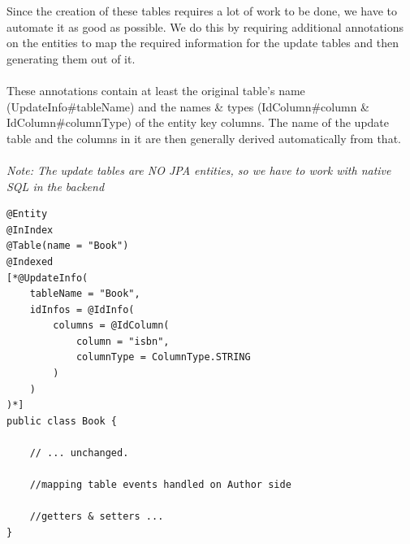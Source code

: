 Since the creation of these tables requires a lot of work to be done, we have to automate it as good as possible. We do this by requiring additional annotations on the entities to map the required information for the update tables and then generating them out of it.
\\\\
These annotations contain at least the original table's name (UpdateInfo\#tableName) and the names \& types (IdColumn\#column \& IdColumn\#columnType) of the entity key columns. The name of the update table and the columns in it are then generally derived automatically from that.
\\\\
\textit{Note: The update tables are NO JPA entities, so we have to work with native SQL in the backend}
\\
\lstset{language=java}
\begin{lstlisting}[frame=htrbl, caption={Book.java with Hibernate Search annotations}, label={lst:book.java_3}]
@Entity
@InIndex
@Table(name = "Book")
@Indexed
[*@UpdateInfo(
	tableName = "Book", 
	idInfos = @IdInfo(
		columns = @IdColumn(
			column = "isbn", 
			columnType = ColumnType.STRING
		)
	)
)*]
public class Book {

	// ... unchanged. 
	
	//mapping table events handled on Author side
	
	//getters & setters ...
}
\end{lstlisting}

\pagebreak

